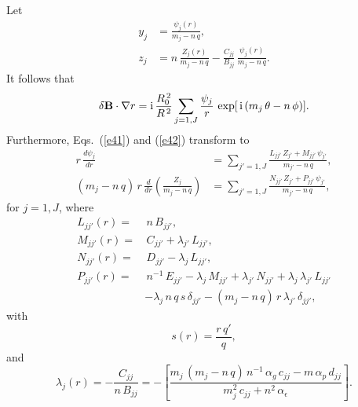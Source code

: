\documentclass[12pt,prb,aps,notitlepage]{revtex4-1}
\begin{document}
Let 
\begin{align}
y_j &= \frac{\psi_j(r)}{m_j-n\,q},\\[0.5ex]
z_j &= n\,\frac{Z_j(r)}{m_j-n\,q}- \frac{C_{jj}}{B_{jj}}\,\frac{\psi_j(r)}{m_j-n\,q}.
\end{align}
It follows that
\begin{equation}
\delta {\bf B}\cdot\nabla r = {\rm i}\,\frac{R_0^{\,2}}{R^{\,2}}\sum_{j=1,J}\frac{\psi_j}{r}\,\exp[\,{\rm i}\,(m_j\,\theta-n\,\phi)].
\end{equation}
Furthermore, Eqs.~(\ref{e41}) and (\ref{e42}) transform to 
\begin{align}\label{e61}
r\,\frac{d\psi_j}{dr} &=\sum_{j'=1,J}\frac{L_{jj'}\,Z_{j'}+M_{jj'}\,\psi_{j'}}{m_{j'}-n\,q},\\[0.5ex]
(m_j-n\,q)\,r\,\frac{d}{dr}\left(\frac{Z_j}{m_j-n\,q}\right)&=\sum_{j'=1,J}\frac{N_{jj'}\,Z_{j'}+P_{jj'}\,\psi_{j'}}{m_{j'}-n\,q},\label{e62}
\end{align}
for $j=1,J$, 
where
\begin{align}
L_{jj'}(r) =&\, n\,B_{jj'},\\[0.5ex]
M_{jj'}(r) =& \,C_{jj'}+\lambda_{j'}\,L_{jj'},\\[0.5ex]
N_{jj'}(r)=& \,D_{jj'}-\lambda_j\,L_{jj'},\\[0.5ex]
P_{jj'}(r) =&\, n^{-1}\,E_{jj'} -\lambda_j\,M_{jj'}+\lambda_{j'}\,N_{jj'} + \lambda_j\,\lambda_{j'}\,L_{jj'}\nonumber\\[0.5ex] &-\lambda_j\,n\,q\,s\,\delta_{jj'} - (m_j-n\,q)\,r\,\lambda_{j'}\,\delta_{jj'},
\end{align}
with 
\begin{equation}
s(r)=\frac{r\,q'}{q},
\end{equation}
 and
\begin{equation}
\lambda_j(r) = -\frac{C_{jj}}{n\,B_{jj}} = -\left[\frac{m_j\,(m_j-n\,q)\,n^{-1}\,\alpha_g\,c_{jj} - m\,\alpha_p\,d_{jj}}{m_j^2\,c_{jj}+n^2\,\alpha_\epsilon}\right].
\end{equation}
\end{document}
